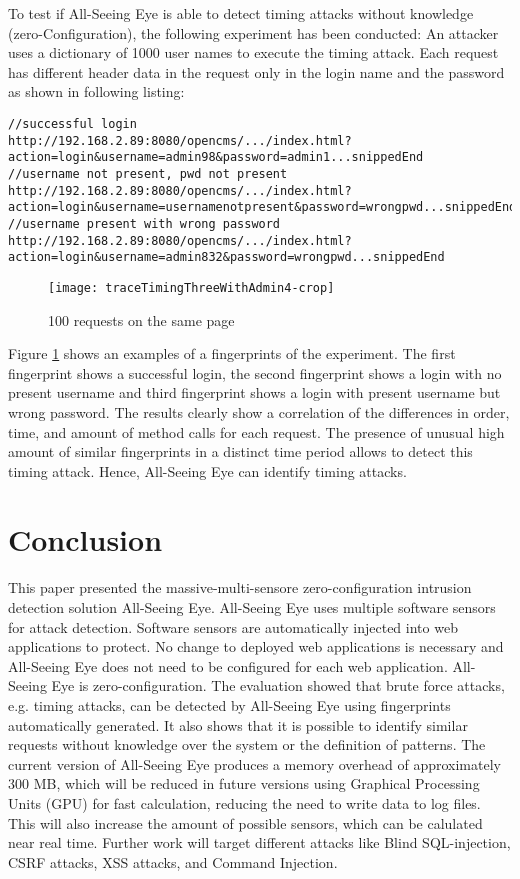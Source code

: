 \documentclass[conference]{IEEEtran}
\begin{document}
To test if All-Seeing Eye is able to detect timing attacks without knowledge (zero-Configuration), the following experiment has been conducted: An attacker uses a dictionary of 1000 user names to execute the timing attack. Each request has different header data in the request only in the login name and the password as shown in following listing:
\begin{lstlisting}
//successful login
http://192.168.2.89:8080/opencms/.../index.html?action=login&username=admin98&password=admin1...snippedEnd
//username not present, pwd not present
http://192.168.2.89:8080/opencms/.../index.html?action=login&username=usernamenotpresent&password=wrongpwd...snippedEnd
//username present with wrong password
http://192.168.2.89:8080/opencms/.../index.html?action=login&username=admin832&password=wrongpwd...snippedEnd
\end{lstlisting}

\begin{figure}
 \centering
\texttt{[image: traceTimingThreeWithAdmin4-crop]}
\caption{100 requests on the same page}\label{figure:traceTiming}
\end{figure}

Figure \ref{figure:traceTiming} shows an examples of a fingerprints of the experiment. The first fingerprint shows a successful login, the second fingerprint shows a login with no present username and third fingerprint shows a login with present username but wrong password. The results clearly show a correlation of the differences in order, time, and amount of method calls for each request. The presence of unusual high amount of similar fingerprints in a distinct time period allows to detect this timing attack. Hence, All-Seeing Eye can identify timing attacks.

\section{Conclusion}\label{conclusion}
This paper presented the massive-multi-sensore zero-configuration intrusion detection solution All-Seeing Eye. All-Seeing Eye uses multiple software sensors for attack detection. Software sensors are automatically injected into web applications to protect. No change to deployed web applications is necessary and All-Seeing Eye does not need to be configured for each web application. All-Seeing Eye is zero-configuration. The evaluation showed that brute force attacks, e.g. timing attacks, can be detected by All-Seeing Eye using fingerprints automatically generated. It also shows that it is possible to identify similar requests without knowledge over the system or the definition of patterns. The current version of All-Seeing Eye produces a memory overhead of approximately 300 MB, which will be reduced in future versions using Graphical Processing Units (GPU) for fast calculation, reducing the need to write data to log files. This will also increase the amount of possible sensors, which can be calulated near real time. Further work will target different attacks like Blind SQL-injection, CSRF attacks, XSS attacks, and Command Injection.
\end{document}
